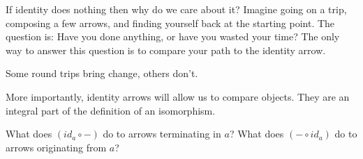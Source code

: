 \documentclass[DaoFP]{subfiles}
\begin{document}
If identity does nothing then why do we care about it? Imagine going on a trip, composing a few arrows, and finding yourself back at the starting point. The question is: Have you done anything, or have you wasted your time? The only way to answer this question is to compare your path to the identity arrow. 

Some round trips bring change, others don't.

More importantly, identity arrows will allow us to compare objects. They are an integral part of the definition of an isomorphism.

\begin{exercise}\label{ex-yoneda-identity}
What does $(id_a \circ -)$ do to arrows terminating in $a$? What does $(- \circ id_a)$ do to arrows originating from $a$?
\end{exercise}
\end{document}
